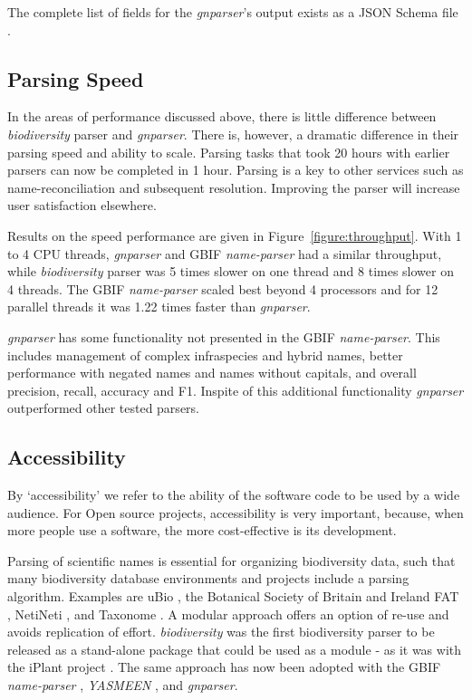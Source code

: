 \documentclass{bmcart}
\begin{document}
The complete list of fields for the \textit{gnparser}'s output exists as
a JSON Schema file \cite{gnparser-json}.

\subsection*{Parsing Speed}

In the areas of performance discussed above, there is little difference between
\textit{biodiversity} parser and \textit{gnparser}. There is, however, a
dramatic difference in their parsing speed and ability to scale. Parsing tasks
that took 20 hours with earlier parsers can now be completed in 1 hour. Parsing
is a key to other services such as name-reconciliation and subsequent
resolution.  Improving the parser will increase user satisfaction elsewhere.

Results on the speed performance are given in Figure~\ref{figure:throughput}.
With 1 to 4 CPU threads, \textit{gnparser} and GBIF \textit{name-parser} had a
similar throughput, while \textit{biodiversity} parser was 5 times slower on
one thread and 8 times slower on 4 threads. The GBIF \textit{name-parser}
scaled best beyond 4 processors and for 12 parallel threads it was 1.22 times
faster than \textit{gnparser}.

\textit{gnparser} has some functionality not presented in the GBIF
\textit{name-parser}. This includes management of complex infraspecies and
hybrid names, better performance with negated names and names without capitals,
and overall precision, recall, accuracy and F1. Inspite of this additional
functionality \textit{gnparser} outperformed other tested parsers.

\subsection*{Accessibility}

By `accessibility' we refer to the ability of the software code to be used by a
wide audience. For Open source projects, accessibility is very important,
because, when more people use a software, the more cost-effective is its
development.

Parsing of scientific names is essential for organizing biodiversity data, such
that many biodiversity database environments and projects include a parsing
algorithm.  Examples are uBio \cite{ubio:parser}, the Botanical Society of
Britain and Ireland \cite{botsociety:parser} FAT \cite{Sautter2006}, NetiNeti
\cite{Akella2012}, and Taxonome \cite{Kluyver2013}. A modular approach offers
an option of re-use and avoids replication of effort. \textit{biodiversity} was
the first biodiversity parser to be released as a stand-alone package that
could be used as a module - as it was with the iPlant project \cite{Boyle2013}.
The same approach has now been adopted with the GBIF \textit{name-parser}
\cite{gbifNameParser}, \textit{YASMEEN} \cite{VandenBerghe2015}, and
\textit{gnparser}.
\end{document}
